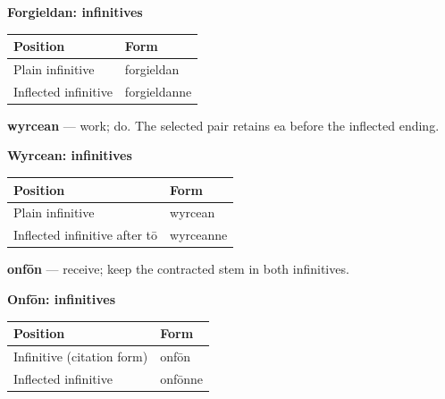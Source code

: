 \textbf{Forgieldan: infinitives}

\par\begingroup
\fontsize{10.5}{13.2}\selectfont
\setlength{\LTleft}{0pt}\setlength{\LTright}{\fill}
\noindent
\begin{tabular}{@{}>{\raggedright\arraybackslash}p{66.31mm}>{\raggedright\arraybackslash}p{54.88mm}@{}}
\toprule
\textbf{Position} & \textbf{Form} \\
\midrule
Plain infinitive & forgieldan \\
Inflected infinitive & forgieldanne \\
\bottomrule
\end{tabular}
\par\endgroup

\textbf{wyrcean} — work; do. The selected pair retains ea before the inflected ending.

\textbf{Wyrcean: infinitives}

\par\begingroup
\fontsize{10.5}{13.2}\selectfont
\setlength{\LTleft}{0pt}\setlength{\LTright}{\fill}
\noindent
\begin{tabular}{@{}>{\raggedright\arraybackslash}p{78.74mm}>{\raggedright\arraybackslash}p{42.45mm}@{}}
\toprule
\textbf{Position} & \textbf{Form} \\
\midrule
Plain infinitive & wyrcean \\
Inflected infinitive after tō & wyrceanne \\
\bottomrule
\end{tabular}
\par\endgroup

\textbf{onfōn} — receive; keep the contracted stem in both infinitives.

\textbf{Onfōn: infinitives}

\par\begingroup
\fontsize{10.5}{13.2}\selectfont
\setlength{\LTleft}{0pt}\setlength{\LTright}{\fill}
\noindent
\begin{tabular}{@{}>{\raggedright\arraybackslash}p{76.63mm}>{\raggedright\arraybackslash}p{44.55mm}@{}}
\toprule
\textbf{Position} & \textbf{Form} \\
\midrule
Infinitive (citation form) & onfōn \\
Inflected infinitive & onfōnne \\
\bottomrule
\end{tabular}
\par\endgroup

